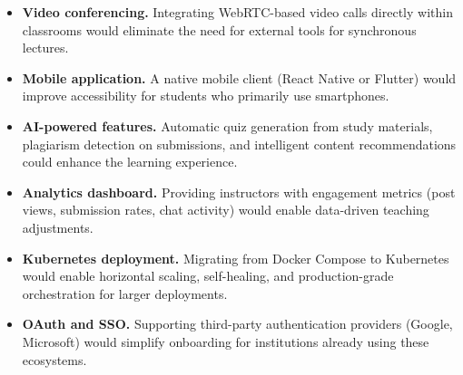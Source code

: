 \begin{itemize}[nosep]
  \item \textbf{Video conferencing.}
        Integrating WebRTC-based video calls directly within classrooms would eliminate the need for external tools for synchronous lectures.
  \item \textbf{Mobile application.}
        A native mobile client (React Native or Flutter) would improve accessibility for students who primarily use smartphones.
  \item \textbf{AI-powered features.}
        Automatic quiz generation from study materials, plagiarism detection on submissions, and intelligent content recommendations could enhance the learning experience.
  \item \textbf{Analytics dashboard.}
        Providing instructors with engagement metrics (post views, submission rates, chat activity) would enable data-driven teaching adjustments.
  \item \textbf{Kubernetes deployment.}
        Migrating from Docker Compose to Kubernetes would enable horizontal scaling, self-healing, and production-grade orchestration for larger deployments.
  \item \textbf{OAuth and SSO.}
        Supporting third-party authentication providers (Google, Microsoft) would simplify onboarding for institutions already using these ecosystems.
\end{itemize}
